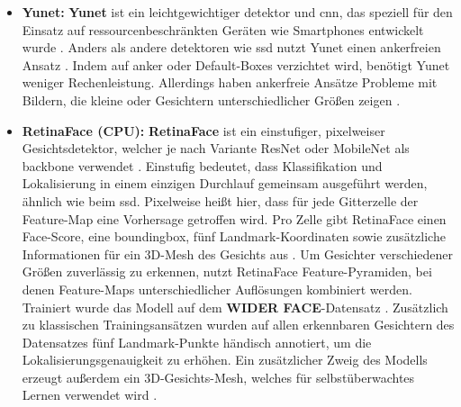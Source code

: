 \begin{itemize}
%	
	\item \textbf{Yunet:} \textbf{Yunet} ist ein leichtgewichtiger \gls{detektor} und \gls{cnn}, das speziell für den Einsatz auf ressourcenbeschränkten Geräten wie Smartphones entwickelt wurde \parencite{wu2023yunet}. Anders als andere \gls{detektor}en wie \gls{ssd} nutzt Yunet einen ankerfreien Ansatz \parencite{wu2023yunet}. Indem auf \gls{anker} oder Default-Boxes verzichtet wird, benötigt Yunet weniger Rechenleistung. Allerdings haben ankerfreie Ansätze Probleme mit Bildern, die kleine oder Gesichtern unterschiedlicher Größen zeigen \parencite{Wang2018}.
%	
	\item \textbf{RetinaFace (CPU):} \textbf{RetinaFace} ist ein einstufiger, pixelweiser Gesichtsdetektor, welcher je nach Variante ResNet oder MobileNet als \gls{backbone} verwendet \parencite{abs-1905-00641}. Einstufig bedeutet, dass Klassifikation und Lokalisierung in einem einzigen Durchlauf gemeinsam ausgeführt werden, ähnlich wie beim \gls{ssd}. Pixelweise heißt hier, dass für jede Gitterzelle der Feature-Map eine Vorhersage getroffen wird. Pro Zelle gibt RetinaFace einen Face-Score, eine \gls{boundingbox}, fünf Landmark-Koordinaten sowie zusätzliche Informationen für ein 3D-Mesh des Gesichts aus \parencite{abs-1905-00641}. Um Gesichter verschiedener Größen zuverlässig zu erkennen, nutzt RetinaFace Feature-Pyramiden, bei denen Feature-Maps unterschiedlicher Auflösungen kombiniert werden. Trainiert wurde das Modell auf dem \textbf{WIDER FACE}-Datensatz \parencite{abs-1905-00641}. Zusätzlich zu klassischen Trainingsansätzen wurden auf allen erkennbaren Gesichtern des Datensatzes fünf Landmark-Punkte händisch annotiert, um die Lokalisierungsgenauigkeit zu erhöhen. Ein zusätzlicher Zweig des Modells erzeugt außerdem ein 3D-Gesichts-Mesh, welches für selbstüberwachtes Lernen verwendet wird \parencite{abs-1905-00641}.
\end{itemize}
